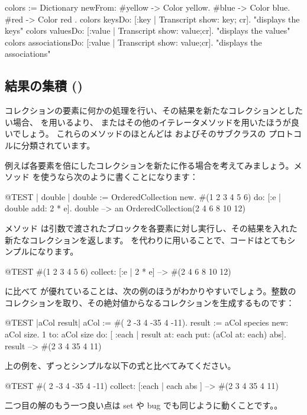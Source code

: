 \documentclass[a4paper,10pt,twoside]{book}
\begin{document}
\begin{code}{}
colors := Dictionary newFrom: { #yellow -> Color yellow. #blue -> Color blue. #red -> Color red }.
colors keysDo: [:key | Transcript show: key; cr].                    "displays the keys"
colors valuesDo: [:value | Transcript show: value;cr].            "displays the values"
colors associationsDo: [:value | Transcript show: value;cr].  "displays the associations"
\end{code}

\subsection{結果の集積 ()}
コレクションの要素に何かの処理を行い、その結果を新たなコレクションとしたい場合、 を用いるより、 またはその他のイテレータメソッドを用いたほうが良いでしょう。
これらのメソッドのほとんどは  およびそのサブクラスの  プロトコルに分類されています。

例えば各要素を倍にしたコレクションを新たに作る場合を考えてみましょう。メソッド  を使うなら次のように書くことになります：

\begin{code}{@TEST | double |}
double := OrderedCollection new.
#(1 2 3 4 5 6) do: [:e | double add: 2 * e].
double --> an OrderedCollection(2 4 6 8 10 12)
\end{code}

\noindent
メソッド  は引数で渡されたブロックを各要素に対し実行し、その結果を入れた新たなコレクションを返します。
 を代わりに用いることで、コードはとてもシンプルになります。
\begin{code}{@TEST}
#(1 2 3 4 5 6) collect: [:e | 2 * e] --> #(2 4 6 8 10 12)
\end{code}

 に比べて  が優れていることは、次の例のほうがわかりやすいでしょう。整数のコレクションを取り、その絶対値からなるコレクションを生成するものです：

\begin{code}{@TEST |aCol result|}
aCol :=  #( 2 -3 4 -35 4 -11).
result := aCol species new: aCol size.
1 to: aCol size do: [ :each | result at: each put: (aCol at: each) abs].
result --> #(2 3 4 35 4 11)
\end{code}
\noindent
上の例を、ずっとシンプルな以下の式と比べてみてください。
\begin{code}{@TEST}
#( 2 -3 4 -35 4 -11) collect: [:each | each abs ] --> #(2 3 4 35 4 11)
\end{code}
\noindent
二つ目の解のもう一つ良い点は set や bug でも同じように動くことです。。
\end{document}
